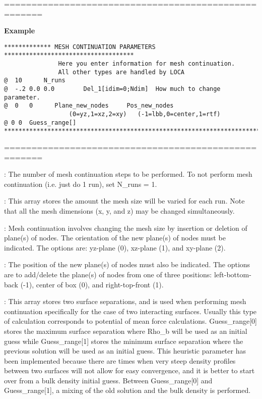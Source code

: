 \documentclass[10pt,onecolumn]{article}
\begin{document}
\noindent=====================================================

{\bf Example}

\begin{verbatim}
************* MESH CONTINUATION PARAMETERS ************************************
               Here you enter information for mesh continuation.
               All other types are handled by LOCA
@  10      N_runs
@  -.2 0.0 0.0        Del_1[idim=0;Ndim]  How much to change parameter.
@  0   0      Plane_new_nodes     Pos_new_nodes
                  (0=yz,1=xz,2=xy)   (-1=lbb,0=center,1=rtf)
@ 0 0  Guess_range[]
***********************************************************************
\end{verbatim}

\noindent=====================================================
\vspace{0.1in}


\vspace{0.1in}
:  The number of mesh continuation steps to be performed.  To not perform mesh continuation (i.e. just do 1 run), set N\_runs = 1.

\vspace{0.1in}
:  This array stores the amount the mesh
size will be varied for each run.  Note that all the mesh dimensions
(x, y, and z) may be changed simultaneously.

\vspace{0.1in}
: Mesh continuation involves changing the mesh size by
insertion or deletion of plane(s) of nodes.
The orientation of the new plane(s) of nodes must be
indicated.  The options are: yz-plane (0), xz-plane (1), and xy-plane (2).

\vspace{0.1in}
:  The position of the new plane(s) of nodes must also be indicated.
The options are to add/delete the plane(s) of nodes from one
of three positions: left-bottom-back (-1), center of box (0),
and right-top-front (1).


\vspace{0.1in}
:  This array stores two surface
separations, and is used when performing mesh continuation
specifically for the case of two interacting surfaces.  Usually
this type of calculation corresponds to potential of mean force
calculations. Guess\_range[0] stores the maximum surface
separation where Rho\_b will be used as an initial guess while
Guess\_range[1] stores the minimum surface separation where the
previous solution will be used as an initial guess.  This
heuristic parameter has been implemented because there are times
when very steep density profiles between two surfaces will not
allow for easy convergence, and it is better to start over from
a bulk density initial guess.  Between Guess\_range[0] and
Guess\_range[1], a mixing of the old solution and the bulk density
is performed.
\end{document}
